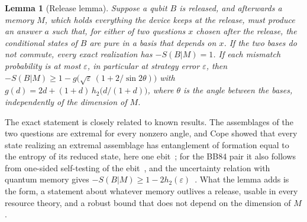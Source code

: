 \documentclass[11pt]{article}
\newtheorem{lemma}[theorem]{Lemma}
\theoremstyle{definition}
\theoremstyle{remark}
\begin{document}
\begin{lemma}[Release lemma]\label{lem:release}
Suppose a qubit $B$ is released, and afterwards a memory $M$, which holds everything the device keeps at the release, must produce an answer $a$ such that, for either of two questions $x$ chosen after the release, the conditional states of $B$ are pure in a basis that depends on $x$. If the two bases do not commute, every exact realization has $-S(B|M)=1$. If each mismatch probability is at most $\varepsilon$, in particular at strategy error $\varepsilon$, then $-S(B|M)\ge1-g\bigl(\sqrt\varepsilon\,(1+2/\sin2\theta)\bigr)$ with $g(d)=2d+(1+d)\,h_2\bigl(d/(1+d)\bigr)$, where $\theta$ is the angle between the bases, independently of the dimension of $M$.
\end{lemma}

The exact statement is closely related to known results. The assemblages of the two questions are extremal for every nonzero angle, and Cope showed that every state realizing an extremal assemblage has entanglement of formation equal to the entropy of its reduced state, here one ebit~\cite[Thm.~1]{Cope21}; for the BB84 pair it also follows from one-sided self-testing of the ebit~\cite{SupicHoban16}, and the uncertainty relation with quantum memory gives $-S(B|M)\ge1-2h_2(\varepsilon)$~\cite{BCCRR10}. What the lemma adds is the form, a statement about whatever memory outlives a release, usable in every resource theory, and a robust bound that does not depend on the dimension of $M$.
\end{document}
